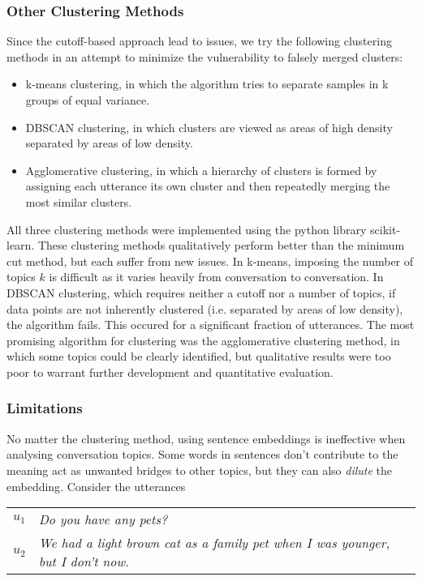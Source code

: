     \subsubsection{Other Clustering Methods}
        Since the cutoff-based approach lead to issues, we try the following clustering methods in an attempt to minimize the vulnerability to falsely merged clusters:
        \begin{itemize}
            \item k-means clustering, in which the algorithm tries to separate samples in k groups of equal variance.
            \item DBSCAN clustering, in which clusters are viewed as areas of high density separated by areas of low density.
            \item Agglomerative clustering, in which a hierarchy of clusters is formed by assigning each utterance its own cluster and then repeatedly merging the most similar clusters.
        \end{itemize}
        All three clustering methods were implemented using the python library scikit-learn\cite{scikit-learn}. These clustering methods qualitatively perform better than the minimum cut method, but each suffer from new issues. In k-means, imposing the number of topics $k$ is difficult as it varies heavily from conversation to conversation. In DBSCAN clustering, which requires neither a cutoff nor a number of topics, if data points are not inherently clustered (i.e. separated by areas of low density), the algorithm fails. This occured for a significant fraction of utterances. The most promising algorithm for clustering was the agglomerative clustering method, in which some topics could be clearly identified, but qualitative results were too poor to warrant further development and quantitative evaluation.
        
    \subsubsection{Limitations}
        No matter the clustering method, using sentence embeddings is ineffective when analysing conversation topics. Some words in sentences don't contribute to the meaning act as unwanted bridges to other topics, but they can also \textit{dilute} the embedding. Consider the utterances
        
        
        \begin{table}[h]
            \begin{tabular}{l|l}
            $u_1$     & \textit{Do you have any pets?}                    \\
            $u_2$     & \textit{We had a light brown cat as a family pet when I was younger, but I don't now.}                        \\
            \end{tabular}
        \end{table}
        
